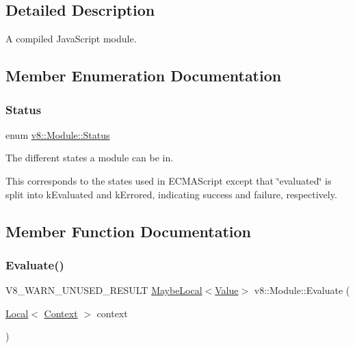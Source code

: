 \subsection{Detailed Description}
A compiled Java\+Script module. 

\subsection{Member Enumeration Documentation}
\mbox{\label{classv8_1_1Module_a9c2a22c9cb8e928d570c38648c648b7e}} 
\subsubsection{\texorpdfstring{Status}{Status}}
{\footnotesize\ttfamily enum \mbox{\hyperlink{classv8_1_1Module_a9c2a22c9cb8e928d570c38648c648b7e}{v8\+::\+Module\+::\+Status}}}

The different states a module can be in.

This corresponds to the states used in E\+C\+M\+A\+Script except that \char`\"{}evaluated\char`\"{} is split into k\+Evaluated and k\+Errored, indicating success and failure, respectively. 

\subsection{Member Function Documentation}
\mbox{\label{classv8_1_1Module_a0785fa83cd3dde1dee086e1f9d31abdc}} 
\subsubsection{\texorpdfstring{Evaluate()}{Evaluate()}}
{\footnotesize\ttfamily V8\+\_\+\+W\+A\+R\+N\+\_\+\+U\+N\+U\+S\+E\+D\+\_\+\+R\+E\+S\+U\+LT \mbox{\hyperlink{classv8_1_1MaybeLocal}{Maybe\+Local}}$<$\mbox{\hyperlink{classv8_1_1Value}{Value}}$>$ v8\+::\+Module\+::\+Evaluate (\begin{DoxyParamCaption}\item[{\mbox{\hyperlink{classv8_1_1Local}{Local}}$<$ \mbox{\hyperlink{classv8_1_1Context}{Context}} $>$}]{context }\end{DoxyParamCaption})}

